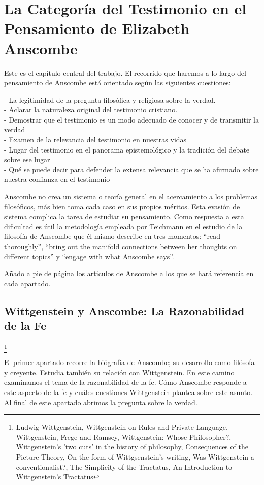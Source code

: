 \documentclass[../main.tex]{subfiles}
\begin{document}
\chapter{La Categoría del Testimonio en el Pensamiento de Elizabeth Anscombe}


Este es el capítulo central del trabajo. El recorrido que haremos a lo largo del pensamiento de Anscombe está orientado según las siguientes cuestiones:

\noindent- La legitimidad de la pregunta filosófica y religiosa sobre la verdad.\\
- Aclarar la naturaleza original del testimonio cristiano.\\
- Demostrar que el testimonio es un modo adecuado de conocer y de transmitir la verdad\\
- Examen de la relevancia del testimonio en nuestras vidas\\
- Lugar del testimonio en el panorama epistemológico y la tradición del debate sobre ese lugar\\
- Qué se puede decir para defender la extensa relevancia que se ha afirmado sobre nuestra confianza en el testimonio

Anscombe no crea un sistema o teoría general en el acercamiento a los problemas filosóficos, más bien toma cada caso en sus propios méritos. Esta evasión de sistema complica la tarea de estudiar su pensamiento. Como respuesta a esta dificultad es útil la metodología empleada por Teichmann en el estudio de la filosofía de Anscombe que él mismo describe en tres momentos: ``read thoroughly'', ``bring out the manifold connections between her thoughts on different topics'' y ``engage with what Anscombe says''.

Añado a pie de página los articulos de Anscombe a los que se hará referencia en cada apartado.


\section{Wittgenstein y Anscombe: La Razonabilidad de la Fe}
\footnote{
Ludwig Wittgenstein, 
Wittgenstein on Rules and Private Language, 
Wittgenstein, Frege and Ramsey, 
Wittgenstein: Whose Philosopher?, 
Wittgenstein's 'two cuts' in the history of philosophy, 
Consequences of the Picture Theory, 
On the form of Wittgsenstein's writing, 
Was Wittgenstein a conventionalist?, 
The Simplicity of the Tractatus, 
An Introduction to Wittgenstein's Tractatus
}

El primer apartado recorre la biógrafía de Anscombe; su desarrollo como filósofa y creyente. Estudia también su relación con Wittgenstein. En este camino examinamos el tema de la razonabilidad de la fe. Cómo Anscombe responde a este aspecto de la fe y cuáles cuestiones Wittgenstein plantea sobre este asunto. Al final de este apartado abrimos la pregunta sobre la verdad.
\end{document}
